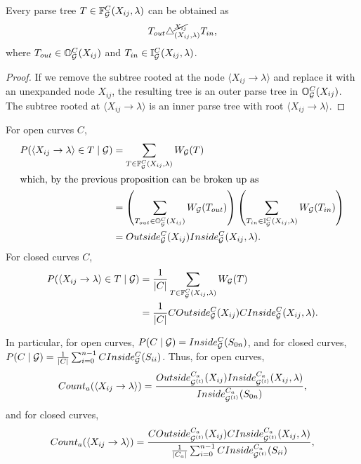 \begin{prop}
Every parse tree $T \in \mathbb{F}_{{\mathcal G}}^C(X_{ij}, \lambda)$ can be obtained as
$$T_{out} \triangle^{\cancel{X_{ij}}}_{(X_{ij},\lambda)} T_{in},$$ 
where $T_{out}\in \mathbb{O}_{{\mathcal G}}^C(X_{ij})$ and $T_{in} \in
\mathbb{I}_{{\mathcal G}}^C(X_{ij}, \lambda)$.
\end{prop}
\begin{proof}
If we remove the subtree rooted at the node $\langle X_{ij} \to
\lambda \rangle$ and replace it with an unexpanded node $X_{ij}$, the
resulting tree is an outer parse tree in $\mathbb{O}_{{\mathcal G}}^C(X_{ij})$. The
subtree rooted at $\langle X_{ij} \to \lambda\rangle$ is an inner
parse tree with root $\langle X_{ij} \to \lambda \rangle$.
\end{proof}

\begin{obs}
For open curves $C$,
\begin{align*}
P(\langle X_{ij} \to \lambda \rangle \in T \mid {\mathcal G}) &=
\sum_{T \in \mathbb{F}_{{\mathcal G}}^C(X_{ij}, \lambda)} W_{{\mathcal G}}(T)\\
\intertext{which, by the previous proposition can be broken up as}
&=
\left(\sum_{T_{out}\in \mathbb{O}_{{\mathcal G}}^C(X_{ij})}
  W_{{\mathcal G}}(T_{out}) \right)
\left(\sum_{T_{in}\in \mathbb{I}_{{\mathcal G}}^C(X_{ij},\lambda)} W_{{\mathcal G}}(T_{in})
\right)\\
&= Outside_{{\mathcal G}}^C(X_{ij}) Inside_{{\mathcal G}}^C(X_{ij}, \lambda).
\end{align*}
For closed curves $C$, 
\begin{align*}
P(\langle X_{ij} \to \lambda \rangle \in T \mid {\mathcal G}) &=
\frac{1}{|C|} \sum_{T \in \mathbb{F}_{{\mathcal G}}^C(X_{ij}, \lambda)} W_{{\mathcal G}}(T)\\
&= \frac{1}{|C|} COutside_{{\mathcal G}}^C(X_{ij}) CInside_{{\mathcal G}}^C(X_{ij}, \lambda).
\end{align*}

\end{obs}

In particular, for open curves, $P(C \mid{\mathcal G}) = Inside_{{\mathcal G}}^{C}(S_{0n})$, and for closed curves, 
$P(C\mid {\mathcal G}) = \frac{1}{|C|} \sum_{i=0}^{n-1} CInside_{{\mathcal G}}^C(S_{ii})$.
Thus, for open curves,
$$Count_a(\langle X_{ij} \to \lambda \rangle) = 
\frac{Outside_{{\mathcal G}^{(t)}}^{C_a}(X_{ij}) Inside_{{\mathcal G}^{(t)}}^{C_a}(X_{ij},\lambda)}{
Inside_{{\mathcal G}^{(t)}}^{C_a}(S_{0n})}, $$
and for closed curves,
$$Count_a(\langle X_{ij} \to \lambda \rangle) = 
\frac{COutside_{{\mathcal G}^{(t)}}^{C_a}(X_{ij}) CInside_{{\mathcal G}^{(t)}}^{C_a}(X_{ij},\lambda)}{
\frac{1}{|C_a|} \sum_{i=0}^{n-1} CInside_{{\mathcal G}^{(t)}}^{C_a}(S_{ii})}, $$

